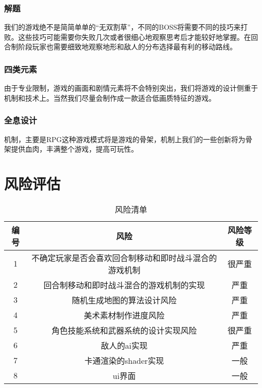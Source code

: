 \documentclass{article}
\begin{document}
\subsubsection{解题}
我们的游戏绝不是简简单单的“无双割草”，不同的BOSS将需要不同的技巧来打败。这些技巧可能需要你失败几次或者很细心地观察思考后才能较好地掌握。在回合制阶段玩家也需要细致地观察地形和敌人的分布选择最有利的移动路线。
\subsubsection{四类元素}
由于专业限制，游戏的画面和剧情元素将不会特别突出，我们将游戏的设计侧重于机制和技术上。当然我们尽量会制作成一款适合低画质特征的游戏。
\subsubsection{全息设计}
机制，主要是RPG这种游戏模式将是游戏的骨架，机制上我们的一些创新将为骨架提供血肉，丰满整个游戏，提高可玩性。
\newpage
\section{风险评估}
\begin{table}[htbp]
\centering
\caption{风险清单}
\begin{tabular}{|c|c|c|}
	\hline
	编号 & 风险 & 风险等级 \\
	\hline
	1 & 不确定玩家是否会喜欢回合制移动和即时战斗混合的游戏机制 & 很严重 \\
	\hline
	2 & 回合制移动和即时战斗混合的游戏机制的实现 & 严重 \\
	\hline
	3 & 随机生成地图的算法设计风险 & 严重 \\
	\hline
	4 & 美术素材制作进度风险 & 严重 \\
	\hline
	5 & 角色技能系统和武器系统的设计实现风险 & 很严重 \\
	\hline
	6 & 敌人的ai实现 & 严重 \\
	\hline
	7 & 卡通渲染的shader实现 & 一般 \\
	\hline
	8 & ui界面 & 一般 \\
	\hline
\end{tabular}
\end{table}
\end{document}
